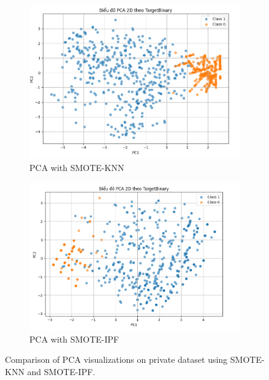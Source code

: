 \documentclass[conference]{IEEEtran}
\begin{document}
\begin{figure}[H]
    \centering
    \begin{subfigure}[b]{0.48\linewidth}
        \includegraphics[width=\linewidth]{images/pca_smote_knn.png}
        \caption{PCA with SMOTE-KNN}
        \label{fig:pca-smote-knn}
    \end{subfigure}
    \hfill
    \begin{subfigure}[b]{0.48\linewidth}
        \includegraphics[width=\linewidth]{images/pca_smote_ipf.png}
        \caption{PCA with SMOTE-IPF}
        \label{fig:pca-smote-ipf}
    \end{subfigure}
    \caption{Comparison of PCA visualizations on private dataset using SMOTE-KNN and SMOTE-IPF.}
    \label{fig:pca-comparison}
\end{figure}
\end{document}
